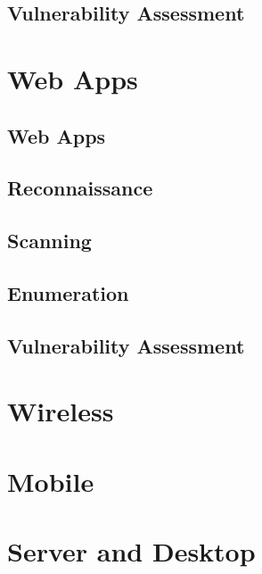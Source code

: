 \documentclass[7x9]{times}
\begin{document}
\section{Vulnerability Assessment}



\chapter{Web Apps}
\section{Web Apps}
\section{Reconnaissance}
\section{Scanning}
\section{Enumeration}
\section{Vulnerability Assessment}

\chapter{Wireless}



\chapter{Mobile}

\chapter{Server and Desktop}

%




\end{document}

